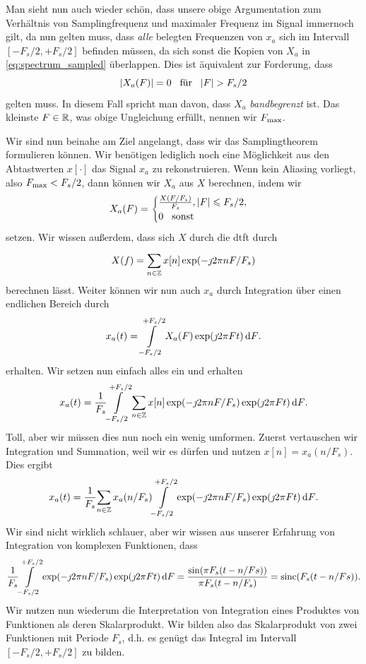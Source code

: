 Man sieht nun auch wieder schön, dass unsere obige Argumentation zum Verhältnis von Samplingfrequenz und maximaler Frequenz im Signal immernoch gilt, da nun gelten muss, dass \emph{alle} belegten Frequenzen von $x_a$ sich im Intervall $[-F_s/2,+F_s/2]$ befinden müssen, da sich sonst die Kopien von $X_a$ in \eqref{eq:spectrum_sampled} überlappen.
Dies ist äquivalent zur Forderung, dass
\[
{\left| X_a(F) \right|} = 0 {\hspace{3mm} \text{für} \hspace{3mm}} {\left| F \right|} > F_s/2
\]
gelten muss. 
In diesem Fall spricht man davon, dass $X_a$ \emph{bandbegrenzt} ist.
Das kleinste $F \in \mathbb{R}$, was obige Ungleichung erfüllt, nennen wir $F_{\rm max}$.

Wir sind nun beinahe am Ziel angelangt, dass wir das Samplingtheorem formulieren können.
Wir benötigen lediglich noch eine Möglichkeit aus den Abtastwerten $x[\cdot]$ das Signal $x_a$ zu rekonstruieren.
Wenn kein Aliasing vorliegt, also $F_{\rm max} < F_s/2$, dann können wir $X_a$ aus $X$ berechnen, indem wir
\[
X_a(F) = \begin{cases}
    \frac{X(F/{F_s})}{F_s}, {\left| F \right|} \leqslant F_s/2, \\
    0 {\hspace{3mm} \text{sonst} \hspace{3mm}}
\end{cases}
\]
setzen.
Wir wissen außerdem, dass sich $X$ durch die \gls{dtft} durch
\[
    X(f) = {\sum\limits_{n \in \mathbb{Z}}^{}{
        x[n] \exp(-\jmath 2 \pi n F/F_s)
    }}
\]
berechnen lässt.
Weiter können wir nun auch $x_a$ durch Integration über einen endlichen Bereich durch
\[
    x_a(t) = {\int\limits_{-F_s/2}^{+F_s/2}{X_a(F) \exp(\jmath 2 \pi F t)}\,\mathrm{d}{F}}.
\]
erhalten. 
Wir setzen nun einfach alles ein und erhalten
\[
x_a(t) = \frac{1}{F_s}{\int\limits_{-F_s/2}^{+F_s/2}{
    {\sum\limits_{n \in \mathbb{Z}}^{}{
        x[n] \exp(-\jmath 2 \pi n F/F_s)
    }} 
    \exp(\jmath 2 \pi F t)}\,\mathrm{d}{F}}.
\]
Toll, aber wir müssen dies nun noch ein wenig umformen. Zuerst vertauschen wir Integration und Summation, weil wir es dürfen und nutzen $x[n] = x_a(n/F_s)$. Dies ergibt
\[
x_a(t) = \frac{1}{F_s}{\sum\limits_{n \in \mathbb{Z}}^{}{
            x_a(n/F_s)
            {\int\limits_{-F_s/2}^{+F_s/2}{
                \exp(-\jmath 2 \pi n F/F_s)
                \exp(\jmath 2 \pi F t)
            }\,\mathrm{d}{F}}
        }}.
\]
Wir sind nicht wirklich schlauer, aber wir wissen aus unserer Erfahrung von Integration von komplexen Funktionen, dass
\[
    \frac{1}{F_s}{\int\limits_{-F_s/2}^{+F_s/2}{
        \exp(-\jmath 2 \pi n F/F_s)
        \exp(\jmath 2 \pi F t)
    }\,\mathrm{d}{F}} = \frac{\sin(\pi F_s (t - n/Fs))}{\pi F_s (t - n/F_s)} = \operatorname*{sinc}(F_s (t - n/Fs)).
\]
Wir nutzen nun wiederum die Interpretation von Integration eines Produktes von Funktionen als deren Skalarprodukt.
Wir bilden also das Skalarprodukt von zwei Funktionen mit Periode $F_s$, d.h. es genügt das Integral im Intervall $[-F_s/2, +F_s/2]$ zu bilden.
